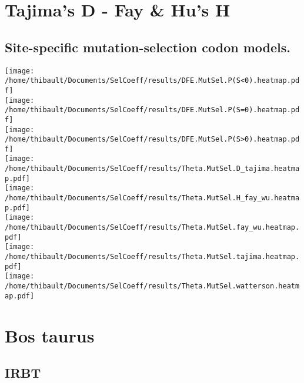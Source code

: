 \section{Tajima's D - Fay \& Hu's H} 
 
\subsection{Site-specific mutation-selection codon models.} 
\begin{center}
\texttt{[image: /home/thibault/Documents/SelCoeff/results/DFE.MutSel.P(S<0).heatmap.pdf]} \\
\texttt{[image: /home/thibault/Documents/SelCoeff/results/DFE.MutSel.P(S=0).heatmap.pdf]} \\
\texttt{[image: /home/thibault/Documents/SelCoeff/results/DFE.MutSel.P(S>0).heatmap.pdf]} \\
\texttt{[image: /home/thibault/Documents/SelCoeff/results/Theta.MutSel.D\_tajima.heatmap.pdf]} \\
\texttt{[image: /home/thibault/Documents/SelCoeff/results/Theta.MutSel.H\_fay\_wu.heatmap.pdf]} \\
\texttt{[image: /home/thibault/Documents/SelCoeff/results/Theta.MutSel.fay\_wu.heatmap.pdf]} \\
\texttt{[image: /home/thibault/Documents/SelCoeff/results/Theta.MutSel.tajima.heatmap.pdf]} \\
\texttt{[image: /home/thibault/Documents/SelCoeff/results/Theta.MutSel.watterson.heatmap.pdf]} \\
\end{center}
\section{Bos taurus} 
 
\subsection{IRBT} 
 
